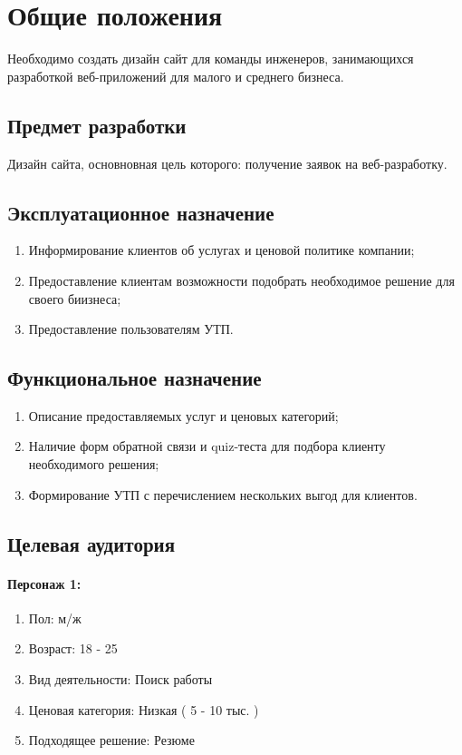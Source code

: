 \section{Общие положения}
  Необходимо создать дизайн сайт для команды инженеров, занимающихся разработкой веб-приложений для малого и среднего бизнеса.

\subsection{Предмет разработки}
  Дизайн сайта, основновная цель которого: получение заявок на веб-разработку.

\subsection{Эксплуатационное назначение}
  \begin{enumerate}
    \item Информирование клиентов об услугах и ценовой политике компании;
    \item Предоставление клиентам возможности подобрать необходимое решение для своего биизнеса;
    \item Предоставление пользователям УТП.
  \end{enumerate}

\subsection{Функциональное назначение}
  \begin{enumerate}
    \item Описание предоставляемых услуг и ценовых категорий;
    \item Наличие форм обратной связи и quiz-теста для подбора клиенту необходимого решения;
    \item Формирование УТП с перечислением нескольких выгод для клиентов.
  \end{enumerate}

\subsection{Целевая аудитория}
\paragraph{Персонаж 1:}
\begin{enumerate}
  \item Пол: м/ж
  \item Возраст: 18 - 25
  \item Вид деятельности: Поиск работы
  \item Ценовая категория: Низкая ( 5 - 10 тыс. )
  \item Подходящее решение: Резюме
\end{enumerate}

